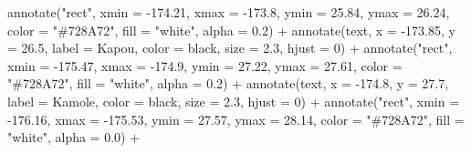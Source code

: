 \documentclass[
]{article}
\newenvironment{Shaded}{\begin{snugshade}}{\end{snugshade}}
\newcommand{\AttributeTok}[1]{\textcolor[rgb]{0.77,0.63,0.00}{#1}}
\newcommand{\DecValTok}[1]{\textcolor[rgb]{0.00,0.00,0.81}{#1}}
\newcommand{\FloatTok}[1]{\textcolor[rgb]{0.00,0.00,0.81}{#1}}
\newcommand{\FunctionTok}[1]{\textcolor[rgb]{0.00,0.00,0.00}{#1}}
\newcommand{\NormalTok}[1]{#1}
\newcommand{\SpecialCharTok}[1]{\textcolor[rgb]{0.00,0.00,0.00}{#1}}
\newcommand{\StringTok}[1]{\textcolor[rgb]{0.31,0.60,0.02}{#1}}
\begin{document}
\begin{Shaded}
\begin{Highlighting}[]
  \FunctionTok{annotate}\NormalTok{(}\StringTok{"rect"}\NormalTok{, }\AttributeTok{xmin =} \SpecialCharTok{{-}}\FloatTok{174.21}\NormalTok{, }\AttributeTok{xmax =} \SpecialCharTok{{-}}\FloatTok{173.8}\NormalTok{, }\AttributeTok{ymin =} \FloatTok{25.84}\NormalTok{, }\AttributeTok{ymax =} \FloatTok{26.24}\NormalTok{, }
           \AttributeTok{color =} \StringTok{"\#728A72"}\NormalTok{, }\AttributeTok{fill =} \StringTok{"white"}\NormalTok{, }\AttributeTok{alpha =} \FloatTok{0.2}\NormalTok{) }\SpecialCharTok{+}
  \FunctionTok{annotate}\NormalTok{(}\StringTok{\textquotesingle{}text\textquotesingle{}}\NormalTok{, }\AttributeTok{x =} \SpecialCharTok{{-}}\FloatTok{173.85}\NormalTok{, }\AttributeTok{y =} \FloatTok{26.5}\NormalTok{, }
           \AttributeTok{label =} \StringTok{\textquotesingle{}Kapou\textquotesingle{}}\NormalTok{, }\AttributeTok{color =} \StringTok{\textquotesingle{}black\textquotesingle{}}\NormalTok{, }\AttributeTok{size =} \FloatTok{2.3}\NormalTok{, }\AttributeTok{hjust =} \DecValTok{0}\NormalTok{) }\SpecialCharTok{+}
  \FunctionTok{annotate}\NormalTok{(}\StringTok{"rect"}\NormalTok{, }\AttributeTok{xmin =} \SpecialCharTok{{-}}\FloatTok{175.47}\NormalTok{, }\AttributeTok{xmax =} \SpecialCharTok{{-}}\FloatTok{174.9}\NormalTok{, }\AttributeTok{ymin =} \FloatTok{27.22}\NormalTok{, }\AttributeTok{ymax =} \FloatTok{27.61}\NormalTok{, }
           \AttributeTok{color =} \StringTok{"\#728A72"}\NormalTok{, }\AttributeTok{fill =} \StringTok{"white"}\NormalTok{, }\AttributeTok{alpha =} \FloatTok{0.2}\NormalTok{) }\SpecialCharTok{+}
  \FunctionTok{annotate}\NormalTok{(}\StringTok{\textquotesingle{}text\textquotesingle{}}\NormalTok{, }\AttributeTok{x =} \SpecialCharTok{{-}}\FloatTok{174.8}\NormalTok{, }\AttributeTok{y =} \FloatTok{27.7}\NormalTok{, }
           \AttributeTok{label =} \StringTok{\textquotesingle{}Kamole\textquotesingle{}}\NormalTok{, }\AttributeTok{color =} \StringTok{\textquotesingle{}black\textquotesingle{}}\NormalTok{, }\AttributeTok{size =} \FloatTok{2.3}\NormalTok{, }\AttributeTok{hjust =} \DecValTok{0}\NormalTok{) }\SpecialCharTok{+}
  \FunctionTok{annotate}\NormalTok{(}\StringTok{"rect"}\NormalTok{, }\AttributeTok{xmin =} \SpecialCharTok{{-}}\FloatTok{176.16}\NormalTok{, }\AttributeTok{xmax =} \SpecialCharTok{{-}}\FloatTok{175.53}\NormalTok{, }\AttributeTok{ymin =} \FloatTok{27.57}\NormalTok{, }\AttributeTok{ymax =} \FloatTok{28.14}\NormalTok{, }
           \AttributeTok{color =} \StringTok{"\#728A72"}\NormalTok{, }\AttributeTok{fill =} \StringTok{"white"}\NormalTok{, }\AttributeTok{alpha =} \FloatTok{0.0}\NormalTok{) }\SpecialCharTok{+}

\end{Highlighting}
\end{Shaded}
\end{document}
